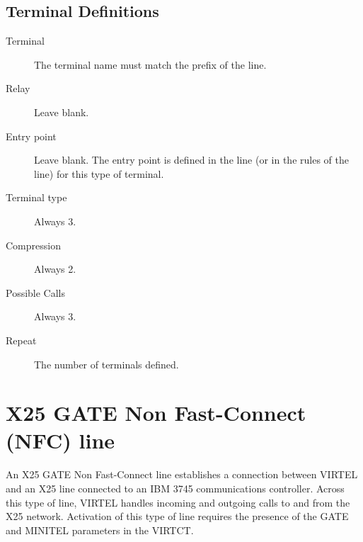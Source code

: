 \documentclass[letterpaper,10pt,english]{sphinxmanual}
\begin{document}
\subsection{Terminal Definitions}
\label{\detokenize{connectivity_guide:id27}}\label{\detokenize{connectivity_guide:index-60}}\begin{description}
\item[{Terminal}] \leavevmode
The terminal name must match the prefix of the line.

\item[{Relay}] \leavevmode
Leave blank.

\item[{Entry point}] \leavevmode
Leave blank. The entry point is defined in the line (or in the rules of the line) for this type of terminal.

\item[{Terminal type}] \leavevmode
Always 3.

\item[{Compression}] \leavevmode
Always 2.

\item[{Possible Calls}] \leavevmode
Always 3.

\item[{Repeat}] \leavevmode
The number of terminals defined.

\end{description}

\newpage


\section{X25 GATE Non Fast-Connect (NFC) line}
\label{\detokenize{connectivity_guide:v457cn-x25gateline}}\label{\detokenize{connectivity_guide:x25-gate-non-fast-connect-nfc-line}}\label{\detokenize{connectivity_guide:index-61}}
An X25 GATE Non Fast-Connect line establishes a connection between VIRTEL and an X25 line connected to an IBM 3745 communications controller. Across this type of line, VIRTEL handles incoming and outgoing calls to and from the X25 network. Activation of this type of line requires the presence of the GATE and MINITEL parameters in the VIRTCT.


\end{document}
